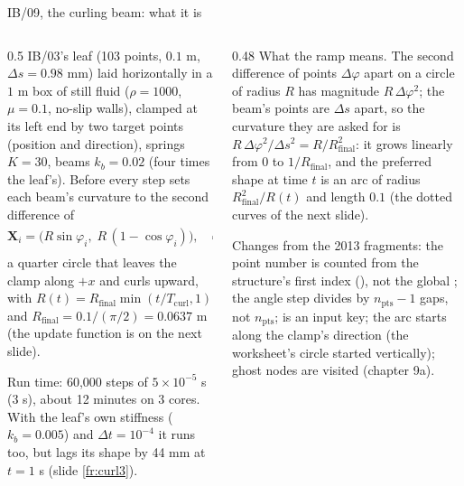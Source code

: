 \documentclass[aspectratio=169,11pt]{beamer}
\begin{document}
\begin{frame}[fragile]{IB/09, the curling beam: what it is}
\label{fr:curl1}
\begin{columns}[T,onlytextwidth]
\begin{column}{0.5\textwidth}
\footnotesize IB/03's leaf (103 points, $0.1$ m, $\Delta s = 0.98$ mm) laid horizontally in a $1$ m box of still fluid ($\rho = 1000$, $\mu = 0.1$, no-slip walls), clamped at its left end by two target points (position and direction), springs $K = 30$, beams $k_b = 0.02$ (four times the leaf's). Before every step  sets each beam's curvature to the second difference of
\[
  \mathbf{X}_i = \big(R\sin\varphi_i,\; R\,(1 - \cos\varphi_i)\big), \quad \varphi_i = \frac{i}{n_{\mathrm{pts}} - 1}\,\frac{\pi}{2},
\]
a quarter circle that leaves the clamp along $+x$ and curls upward, with $R(t) = R_{\mathrm{final}}\min(t/T_{\mathrm{curl}}, 1)$ and $R_{\mathrm{final}} = 0.1/(\pi/2) = 0.0637$ m (the update function is on the next slide).
\vspace{1mm}

\footnotesize Run time: 60,000 steps of $5\times10^{-5}$ s (3 s), about 12 minutes on 3 cores. With the leaf's own stiffness ($k_b = 0.005$) and $\Delta t = 10^{-4}$ it runs too, but lags its shape by 44 mm at $t = 1$ s (slide \ref{fr:curl3}).
\end{column}
\begin{column}{0.48\textwidth}
\footnotesize What the ramp means. The second difference of points $\Delta\varphi$ apart on a circle of radius $R$ has magnitude $R\,\Delta\varphi^2$; the beam's points are $\Delta s$ apart, so the curvature they are asked for is $R\,\Delta\varphi^2/\Delta s^2 = R/R_{\mathrm{final}}^2$: it grows linearly from 0 to $1/R_{\mathrm{final}}$, and the preferred shape at time $t$ is an arc of radius $R_{\mathrm{final}}^2/R(t)$ and length $0.1$ (the dotted curves of the next slide).
\vspace{1mm}

\footnotesize Changes from the 2013 fragments: the point number is counted from the structure's first index (), not the global ; the angle step divides by $n_{\mathrm{pts}} - 1$ gaps, not $n_{\mathrm{pts}}$;  is an input key; the arc starts along the clamp's direction (the worksheet's circle started vertically); ghost nodes are visited (chapter 9a).
\end{column}
\end{columns}
\end{frame}
\end{document}
